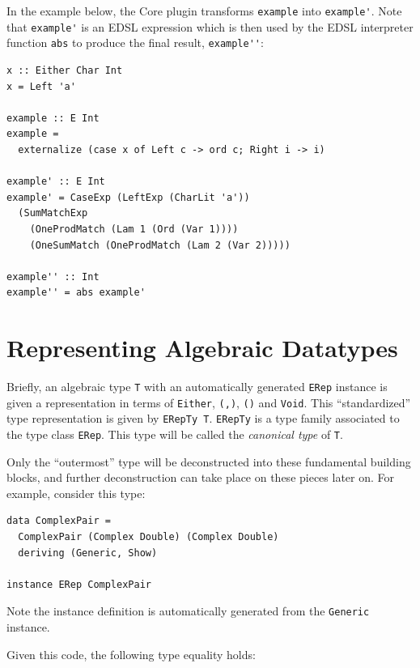 \documentclass[runningheads, a4paper]{llncs}
\newcommand{\ttt}{\texttt}
\newenvironment{todo}
  {\ifthenelse{\isundefined{\showtodos}}{\comment}{\begin{tcolorbox}
    \textbf{TODO}:}}
  {\ifthenelse{\isundefined{\showtodos}}{\endcomment}{\end{tcolorbox}}
  }
\begin{document}
In the example below, the Core plugin transforms \verb|example| into
\verb|example'|. Note that \verb|example'| is an EDSL expression which is then
used by the EDSL interpreter function \verb|abs| to produce the final result,
\verb|example''|:

\begin{lstlisting}[deletekeywords={Ord}]
x :: Either Char Int
x = Left 'a'

example :: E Int
example =
  externalize (case x of Left c -> ord c; Right i -> i)

example' :: E Int
example' = CaseExp (LeftExp (CharLit 'a'))
  (SumMatchExp
    (OneProdMatch (Lam 1 (Ord (Var 1))))
    (OneSumMatch (OneProdMatch (Lam 2 (Var 2)))))

example'' :: Int
example'' = abs example'
\end{lstlisting}

\section{Representing Algebraic Datatypes}
\label{sec:ADTRep}


Briefly, an algebraic type \ttt{T} with an automatically generated \ttt{ERep}
instance is given a representation in terms of \ttt{Either}, \ttt{(,)}, \ttt{()}
and \ttt{Void}.  This ``standardized'' type representation is given by \ttt{ERepTy
T}. \ttt{ERepTy} is a type family associated to the type class \ttt{ERep}. This
type will be called the \textit{canonical type} of \ttt{T}.

Only the ``outermost'' type will be deconstructed into these fundamental building
blocks, and further deconstruction can take place on these pieces later on. For
example, consider this type:

\begin{lstlisting}
data ComplexPair =
  ComplexPair (Complex Double) (Complex Double)
  deriving (Generic, Show)

instance ERep ComplexPair
\end{lstlisting}

Note the instance definition is automatically generated from the \ttt{Generic}
instance.

Given this code, the following type equality holds:
\\
\end{document}
